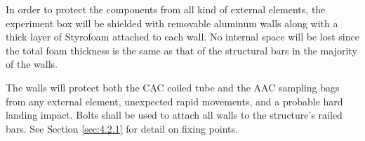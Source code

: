 In order to protect the components from all kind of external elements, the experiment box will be shielded with removable aluminum walls along with a thick layer of Styrofoam attached to each wall. No internal space will be lost since the total foam thickness is the same as that of the structural bars in the majority of the walls. 


The walls will protect both the CAC coiled tube and the AAC sampling bags from any external element, unexpected rapid movements, and a probable hard landing impact. %
Bolts shall be used to attach all walls to the structure's railed bars. See Section \ref{sec:4.2.1} for detail on fixing points.



\raggedbottom